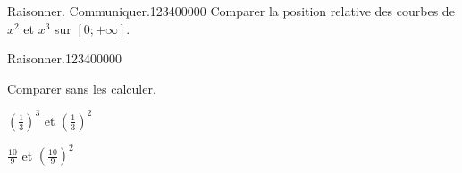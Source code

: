 \begin{pageAD}
\begin{ExoCad}{Raisonner. Communiquer.}{1234}{0}{0}{0}{0}{0}
Comparer la position relative des courbes de $x^2$ et $x^3$ sur $[0;+\infty]$.


%
%
%
%
%
%

\end{ExoCad} 

\begin{ExoCad}{Raisonner.}{1234}{0}{0}{0}{0}{0}

Comparer sans les calculer.

\begin{description}[leftmargin=*]
\item $(\frac{1}{3})^3$ et $(\frac{1}{3})^2$  




\item $\frac{10}{9}$ et $(\frac{10}{9})^2$



\end{description}

\end{ExoCad} 

 
\end{pageAD} %


